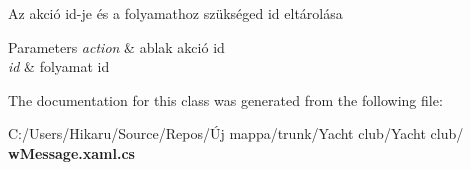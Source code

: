 Az akció id-\/je és a folyamathoz szükséged id eltárolása 


\begin{DoxyParams}{Parameters}
{\em action} & ablak akció id\\
\hline
{\em id} & folyamat id\\
\hline
\end{DoxyParams}


The documentation for this class was generated from the following file\+:\begin{DoxyCompactItemize}
\item 
C\+:/\+Users/\+Hikaru/\+Source/\+Repos/Új mappa/trunk/\+Yacht club/\+Yacht club/\textbf{ w\+Message.\+xaml.\+cs}\end{DoxyCompactItemize}

